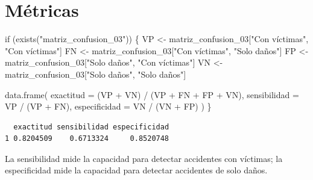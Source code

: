 \documentclass[
  spanish,
  11pt,
  letterpaper,
]{book}
\newenvironment{Shaded}{}{}
\newcommand{\AttributeTok}[1]{\textcolor[rgb]{0.84,0.23,0.29}{#1}}
\newcommand{\ControlFlowTok}[1]{\textcolor[rgb]{0.84,0.23,0.29}{#1}}
\newcommand{\FunctionTok}[1]{\textcolor[rgb]{0.44,0.26,0.76}{#1}}
\newcommand{\NormalTok}[1]{\textcolor[rgb]{0.14,0.16,0.18}{#1}}
\newcommand{\OtherTok}[1]{\textcolor[rgb]{0.44,0.26,0.76}{#1}}
\newcommand{\SpecialCharTok}[1]{\textcolor[rgb]{0.00,0.36,0.77}{#1}}
\newcommand{\StringTok}[1]{\textcolor[rgb]{0.01,0.18,0.38}{#1}}
\begin{document}
\section{Métricas}\label{muxe9tricas}

\begin{Shaded}
\begin{Highlighting}[]
\ControlFlowTok{if}\NormalTok{ (}\FunctionTok{exists}\NormalTok{(}\StringTok{"matriz\_confusion\_03"}\NormalTok{)) \{}
\NormalTok{  VP }\OtherTok{\textless{}{-}}\NormalTok{ matriz\_confusion\_03[}\StringTok{"Con víctimas"}\NormalTok{, }\StringTok{"Con víctimas"}\NormalTok{]}
\NormalTok{  FN }\OtherTok{\textless{}{-}}\NormalTok{ matriz\_confusion\_03[}\StringTok{"Con víctimas"}\NormalTok{, }\StringTok{"Solo daños"}\NormalTok{]}
\NormalTok{  FP }\OtherTok{\textless{}{-}}\NormalTok{ matriz\_confusion\_03[}\StringTok{"Solo daños"}\NormalTok{, }\StringTok{"Con víctimas"}\NormalTok{]}
\NormalTok{  VN }\OtherTok{\textless{}{-}}\NormalTok{ matriz\_confusion\_03[}\StringTok{"Solo daños"}\NormalTok{, }\StringTok{"Solo daños"}\NormalTok{]}

  \FunctionTok{data.frame}\NormalTok{(}
    \AttributeTok{exactitud =}\NormalTok{ (VP }\SpecialCharTok{+}\NormalTok{ VN) }\SpecialCharTok{/}\NormalTok{ (VP }\SpecialCharTok{+}\NormalTok{ FN }\SpecialCharTok{+}\NormalTok{ FP }\SpecialCharTok{+}\NormalTok{ VN),}
    \AttributeTok{sensibilidad =}\NormalTok{ VP }\SpecialCharTok{/}\NormalTok{ (VP }\SpecialCharTok{+}\NormalTok{ FN),}
    \AttributeTok{especificidad =}\NormalTok{ VN }\SpecialCharTok{/}\NormalTok{ (VN }\SpecialCharTok{+}\NormalTok{ FP)}
\NormalTok{  )}
\NormalTok{\}}
\end{Highlighting}
\end{Shaded}

\begin{verbatim}
  exactitud sensibilidad especificidad
1 0.8204509    0.6713324     0.8520748
\end{verbatim}

\begin{tcolorbox}[enhanced jigsaw, arc=.35mm, bottomrule=.15mm, bottomtitle=1mm, breakable, colback=white, colbacktitle=quarto-callout-tip-color!10!white, colframe=quarto-callout-tip-color-frame, coltitle=black, left=2mm, leftrule=.75mm, opacityback=0, opacitybacktitle=0.6, rightrule=.15mm, title=\textcolor{quarto-callout-tip-color}{\faLightbulb}\hspace{0.5em}{Interpretación del resultado}, titlerule=0mm, toprule=.15mm, toptitle=1mm]

La sensibilidad mide la capacidad para detectar accidentes con víctimas;
la especificidad mide la capacidad para detectar accidentes de solo
daños.

\end{tcolorbox}
\end{document}

